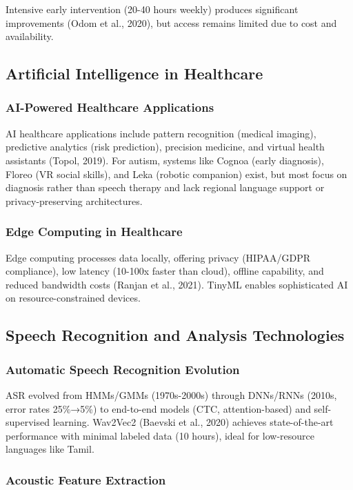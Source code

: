 \documentclass[12pt,a4paper]{article}
\begin{document}
Intensive early intervention (20-40 hours weekly) produces significant improvements (Odom et al., 2020), but access remains limited due to cost and availability.

\subsection{Artificial Intelligence in Healthcare}

\subsubsection{AI-Powered Healthcare Applications}

AI healthcare applications include pattern recognition (medical imaging), predictive analytics (risk prediction), precision medicine, and virtual health assistants (Topol, 2019). For autism, systems like Cognoa (early diagnosis), Floreo (VR social skills), and Leka (robotic companion) exist, but most focus on diagnosis rather than speech therapy and lack regional language support or privacy-preserving architectures.

\subsubsection{Edge Computing in Healthcare}

Edge computing processes data locally, offering privacy (HIPAA/GDPR compliance), low latency (10-100x faster than cloud), offline capability, and reduced bandwidth costs (Ranjan et al., 2021). TinyML enables sophisticated AI on resource-constrained devices.

\subsection{Speech Recognition and Analysis Technologies}

\subsubsection{Automatic Speech Recognition Evolution}

ASR evolved from HMMs/GMMs (1970s-2000s) through DNNs/RNNs (2010s, error rates 25\%→5\%) to end-to-end models (CTC, attention-based) and self-supervised learning. Wav2Vec2 (Baevski et al., 2020) achieves state-of-the-art performance with minimal labeled data (10 hours), ideal for low-resource languages like Tamil.

\subsubsection{Acoustic Feature Extraction}
\end{document}
